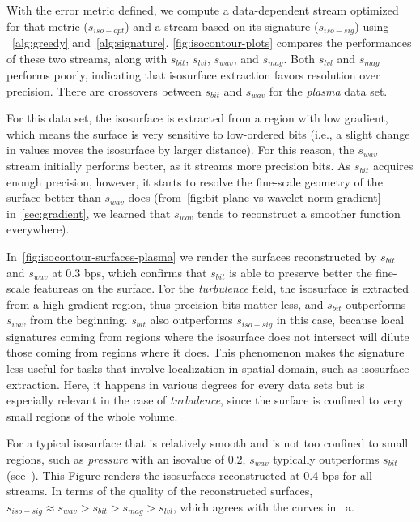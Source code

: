 With the error metric defined, we compute a data-dependent stream optimized for that metric
($s_{iso-opt}$) and a stream based on its signature ($s_{iso-sig}$) using ~\cref{alg:greedy}
and~\cref{alg:signature}. \cref{fig:isocontour-plots} compares the performances of these two
streams, along with $s_{bit}$, $s_{lvl}$, $s_{wav}$, and $s_{mag}$. Both $s_{lvl}$ and $s_{mag}$
performs poorly, indicating that isosurface extraction favors resolution over precision. There are
crossovers between $s_{bit}$ and $s_{wav}$ for the \emph{plasma} data set.

For this data set, the isosurface is extracted from a region with low gradient, which means the
surface is very sensitive to low-ordered bits (i.e., a slight change in values moves the isosurface
by larger distance). For this reason, the $s_{wav}$ stream initially performs better, as it streams
more precision bits. As $s_{bit}$ acquires enough precision, however, it starts to resolve the
fine-scale geometry of the surface better than $s_{wav}$ does
(from~\cref{fig:bit-plane-vs-wavelet-norm-gradient} in~\cref{sec:gradient}, we learned that
$s_{wav}$ tends to reconstruct a smoother function everywhere).

In~\cref{fig:isocontour-surfaces-plasma} we render the surfaces reconstructed by $s_{bit}$ and
$s_{wav}$ at 0.3 bps, which confirms that $s_{bit}$ is able to preserve better the fine-scale
featureas on the surface. For the \emph{turbulence} field, the isosurface is extracted from a
high-gradient region, thus precision bits matter less, and $s_{bit}$ outperforms $s_{wav}$ from the
beginning. $s_{bit}$ also outperforms $s_{iso-sig}$ in this case, because local signatures coming
from regions where the isosurface does not intersect will dilute those coming from regions where it
does. This phenomenon makes the signature less useful for tasks that involve localization in spatial
domain, such as isosurface extraction. Here, it happens in various degrees for every data sets but
is especially relevant in the case of \emph{turbulence}, since the surface is confined to very small
regions of the whole volume.

For a typical isosurface that is relatively smooth and is not too confined to small regions, such as
\emph{pressure} with an isovalue of 0.2, $s_{wav}$ typically outperforms $s_{bit}$
(see~). This Figure renders the isosurfaces reconstructed at
0.4 bps for all streams. In terms of the quality of the reconstructed surfaces, $s_{iso-sig} \approx
s_{wav} > s_{bit} > s_{mag} > s_{lvl}$, which agrees with the curves in
~a. 

